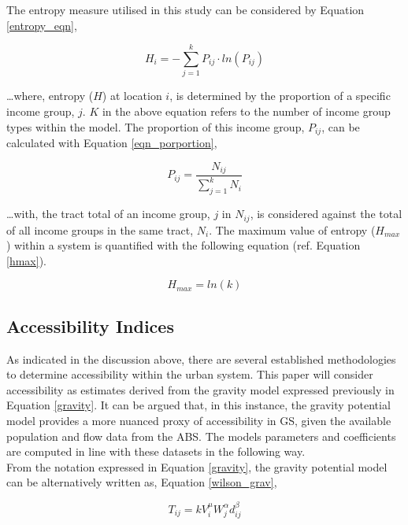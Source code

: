 The entropy measure utilised in this study can be considered by Equation \ref{entropy_eqn},

\begin{equation}
    H_{i} = - \sum^{k}_{j=1}P_{ij} \cdot ln(P_{ij})
    \label{entropy_eqn}
\end{equation}

\ldots where, entropy ($H$) at location $i$, is determined by the  proportion of a specific income group, $j$. $K$ in the above equation refers to the number of income group types within the model. The proportion of this income group, $P_{ij}$, can be calculated with Equation \ref{eqn_porportion},

\begin{equation}
    P_{ij} = \frac{N_{ij}}{\sum_{j=1}^{k}N_{i}}
    \label{eqn_porportion}
\end{equation}

\ldots with, the tract total of an income group, $j$ in $N_{ij}$, is considered against the total of all income groups in the same tract, $N_{i}$. The maximum value of entropy ($H_{max}$) within a system is quantified with the following equation (ref. Equation \ref{hmax}).

\begin{equation}
    H_{max} = ln(k)
    \label{hmax}
\end{equation}

\subsection{Accessibility Indices}

As indicated in the discussion above, there are several established methodologies to determine accessibility within the urban system. This paper will consider accessibility as estimates derived from the gravity model expressed previously in Equation \ref{gravity}. It can be argued that, in this instance, the gravity potential model provides a more nuanced proxy of accessibility in GS, given the available population and flow data from the ABS. The models parameters and coefficients are computed in line with these datasets in the following way.\\

From the notation expressed in Equation \ref{gravity}, the gravity potential model can be alternatively written as, Equation \ref{wilson_grav}, 

\begin{equation}
    T_{ij} = k V_{i}^{\mu} W_{j}^{\alpha} d_{ij}^{\beta}
    \label{wilson_grav}
\end{equation}

